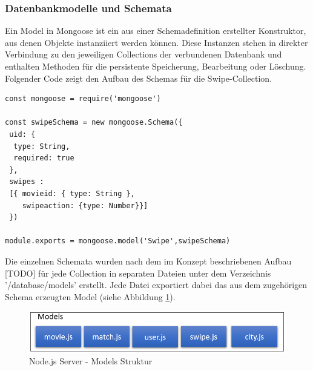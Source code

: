 \subsubsection{Datenbankmodelle und Schemata}

Ein Model in Mongoose ist ein aus einer Schemadefinition erstellter Konstruktor, aus denen Objekte instanziiert werden können. Diese Instanzen stehen in direkter Verbindung zu den jeweiligen Collections der verbundenen Datenbank und enthalten Methoden für die persistente Speicherung, Bearbeitung oder Löschung.
\newline
Folgender Code zeigt den Aufbau des Schemas für die Swipe-Collection. \\

\begin{lstlisting}[caption=Swipe Schema und Model, label=lst:modelswipe]
const mongoose = require('mongoose')

const swipeSchema = new mongoose.Schema({
 uid: {
  type: String,
  required: true
 },
 swipes :
 [{ movieid: { type: String },
    swipeaction: {type: Number}}]
 })

module.exports = mongoose.model('Swipe',swipeSchema)
\end{lstlisting}

\noindent
Die einzelnen Schemata wurden nach dem im Konzept beschriebenen Aufbau [TODO] für jede Collection in separaten Dateien unter dem Verzeichnis '/database/models' erstellt. Jede Datei exportiert dabei das aus dem zugehörigen Schema erzeugten Model (siehe Abbildung \ref{fig:node_structure}).

\begin{figure}[tbt]
\centering
\includegraphics[width=12cm]{images/modelsstruktur.PNG}
\caption{Node.js Server - Models Struktur}
\label{fig:node_structure}
\end{figure}
